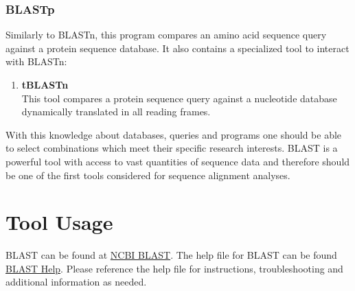         \subsubsection{BLASTp}
        Similarly to BLASTn, this program compares an amino acid sequence query against a protein   sequence database.\autocite{B1} It also contains a specialized tool to interact with BLASTn:
                    \begin{enumerate}
                        \item \textbf{tBLASTn} \\
                            This tool compares a protein sequence query against a nucleotide   database dynamically translated in all reading frames.\autocite{B1}
                    \end{enumerate} \hfill 
    \begin{center}
         \hspace{10pt}   \hspace{10pt}  
    \end{center}
                    
    With this knowledge about databases, queries and programs one should be able to select combinations which meet their specific research interests.\autocite{B2} BLAST is a powerful tool with access to vast quantities of sequence data and therefore should be one of the first tools considered for sequence alignment analyses.
    
\section{Tool Usage}

BLAST can be found at \href{https://blast.ncbi.nlm.nih.gov/Blast.cgi?CMD=Web\&PAGE_TYPE=BlastHome}{NCBI BLAST}. The help file for BLAST can be found \href{https://blast.ncbi.nlm.nih.gov/Blast.cgi?CMD=Web\&PAGE_TYPE=BlastDocs\&DOC_TYPE=BlastHelp}{BLAST Help}.
Please reference the help file for instructions, troubleshooting and additional information as needed.

